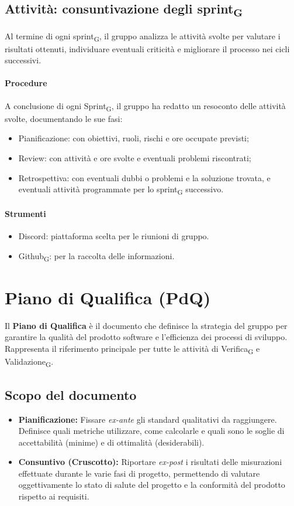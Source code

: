 \documentclass[11pt,a4paper]{article}
\newcommand{\gls}[1]{#1\textsubscript{G}}
\begin{document}
\subsection{Attività: consuntivazione degli \gls{sprint}}
Al termine di ogni \gls{sprint}, il gruppo analizza le attività svolte per valutare i risultati ottenuti, individuare eventuali criticità e migliorare il processo nei cicli successivi.

\paragraph{Procedure}
A conclusione di ogni \gls{Sprint}, il gruppo ha redatto un resoconto delle attività svolte, documentando le sue fasi:
\begin{itemize}
\item Pianificazione: con obiettivi, ruoli, rischi e ore occupate previsti;
\item Review: con attività e ore svolte e eventuali problemi riscontrati;
\item Retrospettiva: con eventuali dubbi o problemi e la soluzione trovata, e eventuali attività programmate per lo \gls{sprint} successivo. 
\end{itemize}

\paragraph{Strumenti}
\begin{itemize}
\item Discord: piattaforma scelta per le riunioni di gruppo.
\item \gls{Github}: per la raccolta delle informazioni.
\end{itemize}

\newpage

\section{Piano di Qualifica (PdQ)}
Il \textbf{Piano di Qualifica} è il documento che definisce la strategia del gruppo per garantire la qualità del prodotto software e l'efficienza dei processi di sviluppo. Rappresenta il riferimento principale per tutte le attività di \gls{Verifica} e \gls{Validazione}.

\subsection{Scopo del documento}
\begin{itemize}
    \item \textbf{Pianificazione:} Fissare \textit{ex-ante} gli standard qualitativi da raggiungere. Definisce quali metriche utilizzare, come calcolarle e quali sono le soglie di accettabilità (minime) e di ottimalità (desiderabili).
    \item \textbf{Consuntivo (Cruscotto):} Riportare \textit{ex-post} i risultati delle misurazioni effettuate durante le varie fasi di progetto, permettendo di valutare oggettivamente lo stato di salute del progetto e la conformità del prodotto rispetto ai requisiti.
\end{itemize}
\end{document}
